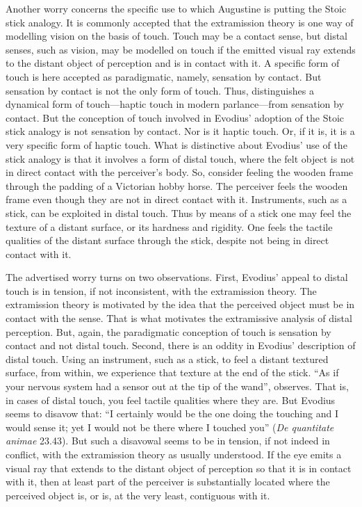 \documentclass[12pt]{article}
\begin{document}
Another worry concerns the specific use to which Augustine is putting the Stoic stick analogy. It is commonly accepted that the extramission theory is one way of modelling vision on the basis of touch. Touch may be a contact sense, but distal senses, such as vision, may be modelled on touch if the emitted visual ray extends to the distant object of perception and is in contact with it. A specific form of touch is here accepted as paradigmatic, namely, sensation by contact. But sensation by contact is not the only form of touch. Thus, \citet{Broad:1952kx} distinguishes a dynamical form of touch---haptic touch in modern parlance---from sensation by contact. But the conception of touch involved in Evodius' adoption of the Stoic stick analogy is not sensation by contact. Nor is it haptic touch. Or, if it is, it is a very specific form of haptic touch. What is distinctive about Evodius' use of the stick analogy is that it involves a form of distal touch, where the felt object is not in direct contact with the perceiver's body. So, consider feeling the wooden frame through the padding of a Victorian hobby horse. The perceiver feels the wooden frame even though they are not in direct contact with it. Instruments, such as a stick, can be exploited in distal touch. Thus by means of a stick one may feel the texture of a distant surface, or its hardness and rigidity. One feels the tactile qualities of the distant surface through the stick, despite not being in direct contact with it. 

The advertised worry turns on two observations. First, Evodius' appeal to distal touch is in tension, if not inconsistent, with the extramission theory. The extramission theory is motivated by the idea that the perceived object must be in contact with the sense. That is what motivates the extramissive analysis of distal perception. But, again, the paradigmatic conception of touch is sensation by contact and not distal touch. Second, there is an oddity in Evodius' description of distal touch. Using an instrument, such as a stick, to feel a distant textured surface, from within, we experience that texture at the end of the stick. ``As if your nervous system had a sensor out at the tip of the wand'', \citet[47]{Dennett:1993ce} observes. That is, in cases of distal touch, you feel tactile qualities where they are. But Evodius seems to disavow that: ``I certainly would be the one doing the touching and I would sense it; yet I would not be there where I touched you'' (\emph{De quantitate animae} 23.43). But such a disavowal seems to be in tension, if not indeed in conflict, with the extramission theory as usually understood. If the eye emits a visual ray that extends to the distant object of perception so that it is in contact with it, then at least part of the perceiver is substantially located where the perceived object is, or is, at the very least, contiguous with it.
 
\end{document}

